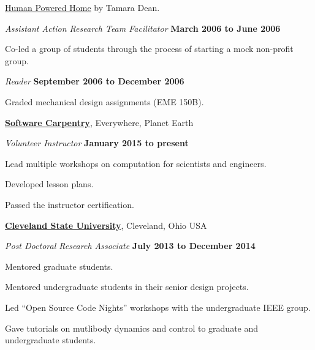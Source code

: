 \documentclass[10pt]{article}
\newenvironment{outerlist}[1][\enskip\textbullet]%
        {\begin{itemize}[#1]}{\end{itemize}%
         \vspace{-.6\baselineskip}}
\newenvironment{innerlist}[1][\enskip\textbullet]%
        {\begin{compactitem}[#1]}{\end{compactitem}}
\newcommand{\blankline}{\quad\pagebreak[2]}
\begin{document}
\begin{outerlist}
\begin{innerlist}
        \href{http://www.thehumanpoweredhome.com/}{\underline{Human Powered
        Home}} by Tamara Dean.
  \end{innerlist}
  \item[] \textit{Assistant Action Research Team Facilitator}%
    \hfill \textbf{March 2006 to June 2006}
  \begin{innerlist}
    \item Co-led a group of students through the process of starting a mock
        non-profit group.
  \end{innerlist}
  \item[] \textit{Reader}%
    \hfill \textbf{September 2006 to December 2006}
  \begin{innerlist}
    \item Graded mechanical design assignments (EME 150B).
  \end{innerlist}
\end{outerlist}

\blankline

\href{http://www.software-carpentry.org}{\textbf{Software Carpentry}},
Everywhere, Planet Earth
\begin{outerlist}
  \item[] \textit{Volunteer Instructor}%
    \hfill \textbf{January 2015 to present}
  \begin{innerlist}
    \item Lead multiple workshops on computation for scientists and engineers.
    \item Developed lesson plans.
    \item Passed the instructor certification.
  \end{innerlist}
\end{outerlist}

\blankline

\href{http://csuohio.edu}{\textbf{Cleveland State University}}, Cleveland, Ohio USA
\begin{outerlist}
  \item[] \textit{Post Doctoral Research Associate}
    \hfill \textbf{July 2013 to December 2014}
  \begin{innerlist}
    \item Mentored graduate students.
    \item Mentored undergraduate students in their senior design projects.
    \item Led ``Open Source Code Nights'' workshops with the undergraduate IEEE group.
    \item Gave tutorials on mutlibody dynamics and control to graduate and
      undergraduate students.
  \end{innerlist}
\end{outerlist}
\end{document}
